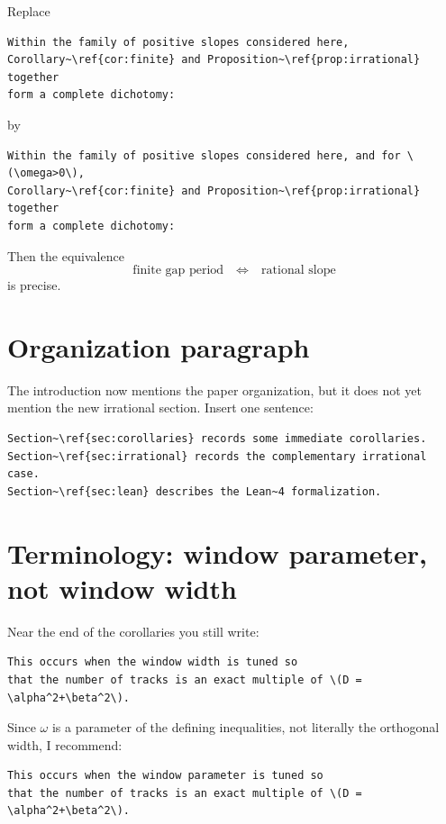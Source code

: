 \documentclass[11pt]{article}
\begin{document}
Replace

\begin{lstlisting}
Within the family of positive slopes considered here,
Corollary~\ref{cor:finite} and Proposition~\ref{prop:irrational} together
form a complete dichotomy:
\end{lstlisting}

by

\begin{lstlisting}
Within the family of positive slopes considered here, and for \(\omega>0\),
Corollary~\ref{cor:finite} and Proposition~\ref{prop:irrational} together
form a complete dichotomy:
\end{lstlisting}

Then the equivalence
\[
    \text{finite gap period}
    \quad\Longleftrightarrow\quad
    \text{rational slope}
\]
is precise.

\section{Organization paragraph}

The introduction now mentions the paper organization, but it does not yet
mention the new irrational section.  Insert one sentence:

\begin{lstlisting}
Section~\ref{sec:corollaries} records some immediate corollaries.
Section~\ref{sec:irrational} records the complementary irrational case.
Section~\ref{sec:lean} describes the Lean~4 formalization.
\end{lstlisting}

\section{Terminology: window parameter, not window width}

Near the end of the corollaries you still write:

\begin{lstlisting}
This occurs when the window width is tuned so
that the number of tracks is an exact multiple of \(D = \alpha^2+\beta^2\).
\end{lstlisting}

Since \(\omega\) is a parameter of the defining inequalities, not literally
the orthogonal width, I recommend:

\begin{lstlisting}
This occurs when the window parameter is tuned so
that the number of tracks is an exact multiple of \(D = \alpha^2+\beta^2\).
\end{lstlisting}
\end{document}
